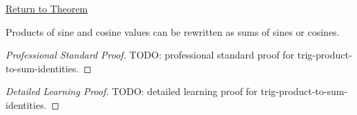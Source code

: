 \newpage
{}
\label{prf:trig-product-to-sum-identities}

\begin{remark*}[Return]
\hyperref[thm:trig-product-to-sum-identities]{Return to Theorem}
\end{remark*}

\begin{theorem*}
Products of sine and cosine values can be rewritten as sums of sines or
cosines.
\end{theorem*}

\begin{proof}[Professional Standard Proof]
\LRAProofBodyStart
TODO: professional standard proof for trig-product-to-sum-identities.
\end{proof}

\begin{proof}[Detailed Learning Proof]
\LRAProofBodyStart
TODO: detailed learning proof for trig-product-to-sum-identities.
\end{proof}

\clearpage
